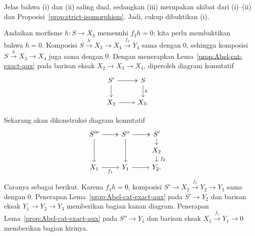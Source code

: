 \begin{bukti}
	Jelas bahwa (i) dan (ii) saling dual, sedangkan (iii) merupakan akibat
	dari (i)--(ii) dan Proposisi~\ref{prop:strict-isomorphism}. Jadi, cukup
	dibuktikan (i).
	
	Andaikan morfisme $h: S \to X_3$ memenuhi $f_3 h = 0$; kita perlu
	membuktikan bahwa $h = 0$. Komposisi
	$S \xrightarrow{h} X_3 \to X_4 \xrightarrow{f_4} Y_4$ sama dengan $0$,
	sehingga komposisi $S \xrightarrow{h} X_3 \to X_4$ juga sama dengan
	$0$. Dengan menerapkan Lema~\ref{prop:Abel-cat-exact-aux} pada barisan
	eksak $X_2 \to X_3 \to X_4$, diperoleh diagram komutatif
	\[\begin{tikzcd}
		S' \arrow[twoheadrightarrow, r] \arrow[d] & S \arrow[d, "h"] \\
		X_2 \arrow[r] & X_3 .
	\end{tikzcd}\]

	Sekarang akan dikonstruksi diagram komutatif
	\[\begin{tikzcd}[row sep=small]
		S''' \arrow[twoheadrightarrow, r] \arrow[dd] & S'' \arrow[twoheadrightarrow, r] \arrow[dd] & S' \arrow[d] \\
		& & X_2 \arrow[d, "f_2" inner sep=0.5em] \\
		X_1 \arrow[r, "f_1"'] & Y_1 \arrow[r] & Y_2 . 
	\end{tikzcd}\]
	Caranya sebagai berikut. Karena $f_3 h = 0$, komposisi
	$S' \to X_2 \xrightarrow{f_2} Y_2 \to Y_3$
	sama dengan $0$. Penerapan Lema~\ref{prop:Abel-cat-exact-aux} pada
	$S' \to Y_2$ dan barisan eksak $Y_1 \to Y_2 \to Y_3$ memberikan bagian
	kanan diagram. Penerapan Lema~\ref{prop:Abel-cat-exact-aux} pada
	$S'' \to Y_1$ dan barisan
	eksak $X_1 \xrightarrow{f_1} Y_1 \to 0$ memberikan bagian kirinya.
	

\end{bukti}
